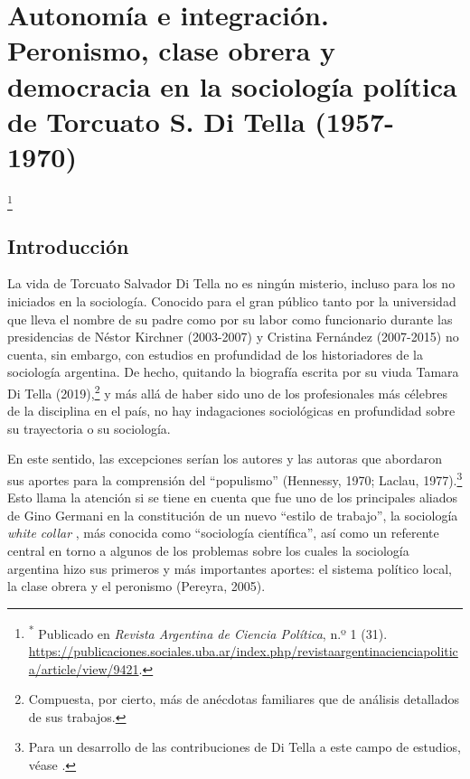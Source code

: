 \chapter{Autonomía e integración. Peronismo, clase obrera y democracia en la sociología política de Torcuato S. Di Tella (1957-1970)}

\footnote{\textsuperscript{*} Publicado en \emph{Revista Argentina de Ciencia Política}, n.º 1 (31). \url{https://publicaciones.sociales.uba.ar/index.php/revistaargentinacienciapolitica/article/view/9421}.}

\section{Introducción}

La vida de Torcuato Salvador Di Tella no es ningún misterio, incluso para los no iniciados en la sociología. Conocido para el gran público tanto por la universidad que lleva el nombre de su padre como por su labor como funcionario durante las presidencias de Néstor Kirchner (2003-2007) y Cristina Fernández (2007-2015) no cuenta, sin embargo, con estudios en profundidad de los historiadores de la sociología argentina. De hecho, quitando la biografía escrita por su viuda Tamara Di Tella (2019),\footnote{Compuesta, por cierto, más de anécdotas familiares que de análisis detallados de sus trabajos.} y más allá de haber sido uno de los profesionales más célebres de la disciplina en el país, no hay indagaciones sociológicas en profundidad sobre su trayectoria o su sociología.

En este sentido, las excepciones serían los autores y las autoras que abordaron sus aportes para la comprensión del \enquote{populismo} \parencite{1531-QUATTROCCHIWOISSON1997,1555-CANOVAN1981}(Hennessy, 1970; Laclau, 1977).\footnote{Para un desarrollo de las contribuciones de Di Tella a este campo de estudios, véase \textcite[234-242]{278-AMARAL2018}.} Esto llama la atención si se tiene en cuenta que fue uno de los principales aliados de Gino Germani en la constitución de un nuevo \enquote{estilo de trabajo}, la sociología \emph{white collar} \parencite{1613-DELICH1977}, más conocida como \enquote{sociología científica}, así como un referente central en torno a algunos de los problemas sobre los cuales la sociología argentina hizo sus primeros y más importantes aportes: el sistema político local, la clase obrera y el peronismo \parencite{1511-SARLO2001,1548-NEIBURG1998,1565-BLANCO2006}(Pereyra, 2005).

